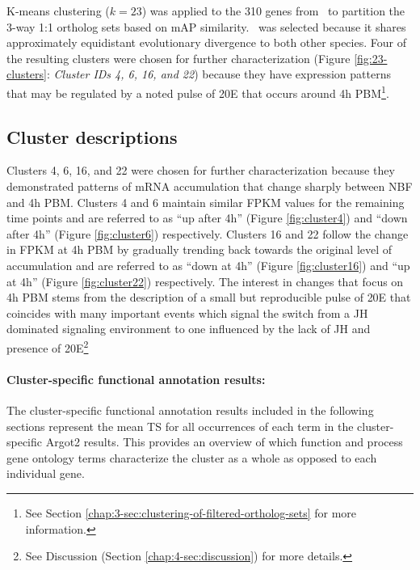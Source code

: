 K-means clustering ($k=23$) was applied to the 310 genes from \Ag\ to partition the 3-way 1:1 ortholog sets based on \gls{mAP} similarity.
%
\Ag\ was selected because it shares approximately equidistant evolutionary divergence to both other species.
%
Four of the resulting clusters were chosen for further characterization (Figure \ref{fig:23-clusters}: \textit{Cluster IDs 4, 6, 16, and 22}) because they have expression patterns that may be regulated by a noted pulse of \gls{20E} that occurs around 4h \gls{PBM}\footnote{See Section \ref{chap:3-sec:clustering-of-filtered-ortholog-sets} for more information.}.
%


\subsection{Cluster descriptions}

Clusters 4, 6, 16, and 22 were chosen for further characterization because they demonstrated patterns of mRNA accumulation that change sharply between \gls{NBF} and 4h \gls{PBM}.
%
Clusters 4 and 6 maintain similar \gls{FPKM} values for the remaining time points and are referred to as ``up after 4h'' (Figure \ref{fig:cluster4}) and ``down after 4h'' (Figure \ref{fig:cluster6}) respectively.
%
Clusters 16 and 22 follow the change in \gls{FPKM} at 4h \gls{PBM} by gradually trending back towards the original level of accumulation and are referred to as ``down at 4h'' (Figure \ref{fig:cluster16}) and ``up at 4h'' (Figure \ref{fig:cluster22}) respectively.
%
The interest in changes that focus on 4h \gls{PBM} stems from the description of a small but reproducible pulse of \gls{20E} that coincides with many important events which signal the switch from a \gls{JH} dominated signaling environment to one influenced by the lack of \gls{JH} and presence of \gls{20E}\footnote{See Discussion (Section \ref{chap:4-sec:discussion}) for more details.}

\paragraph*{Cluster-specific functional annotation results:}

The cluster-specific functional annotation results included in the following sections represent the mean \gls{TS} for all occurrences of each term in the cluster-specific \gls{Argot2} results.
%
This provides an overview of which function and process gene ontology terms characterize the cluster as a whole as opposed to each individual gene.

